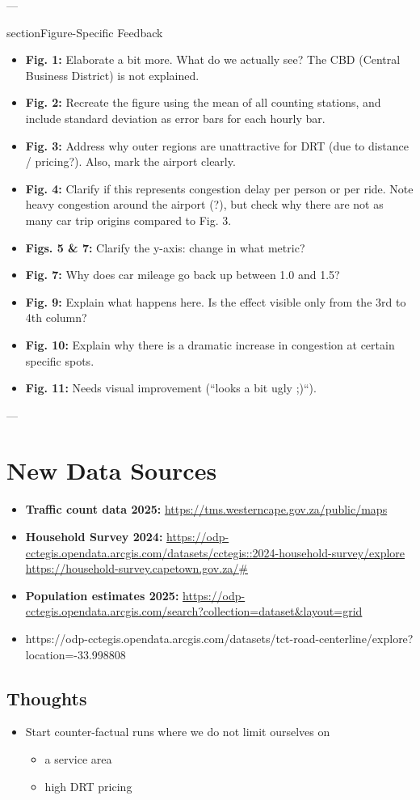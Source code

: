 \documentclass[11pt, a4paper]{article}
\begin{document}
---

\subcaption[]{}section{Figure-Specific Feedback}

\begin{itemize}
    \item \textbf{Fig. 1:} Elaborate a bit more. What do we actually see? The CBD (Central Business District) is not explained.
    \item \textbf{Fig. 2:} Recreate the figure using the mean of all counting stations, and include standard deviation as error bars for each hourly bar.
    \item \textbf{Fig. 3:} Address why outer regions are unattractive for DRT (due to distance / pricing?). Also, mark the airport clearly.
    \item \textbf{Fig. 4:} Clarify if this represents congestion delay per person or per ride. Note heavy congestion around the airport (?), but check why there are not as many car trip origins compared to Fig. 3.
    \item \textbf{Figs. 5 \& 7:} Clarify the y-axis: change in what metric?
    \item \textbf{Fig. 7:} Why does car mileage go back up between 1.0 and 1.5?
    \item \textbf{Fig. 9:} Explain what happens here. Is the effect visible only from the 3rd to 4th column?
    \item \textbf{Fig. 10:} Explain why there is a dramatic increase in congestion at certain specific spots.
    \item \textbf{Fig. 11:} Needs visual improvement (``looks a bit ugly ;)``).
\end{itemize}

---

\section{New Data Sources}

\begin{itemize}
    \item \textbf{Traffic count data 2025:} 
    \url{https://tms.westerncape.gov.za/public/maps}
    \item \textbf{Household Survey 2024:} 
    \url{https://odp-cctegis.opendata.arcgis.com/datasets/cctegis::2024-household-survey/explore} \\
    \url{https://household-survey.capetown.gov.za/\#}
    \item \textbf{Population estimates 2025:} 
    \url{https://odp-cctegis.opendata.arcgis.com/search?collection=dataset&layout=grid}
    \item https://odp-cctegis.opendata.arcgis.com/datasets/tct-road-centerline/explore?location=-33.998808%
\end{itemize}

\subsection{Thoughts}

\begin{itemize}
    \item Start counter-factual runs where we do not limit ourselves on \begin{itemize}
        \item a service area
        \item high DRT pricing 
    \end{itemize}
    
\end{itemize}
\end{document}
